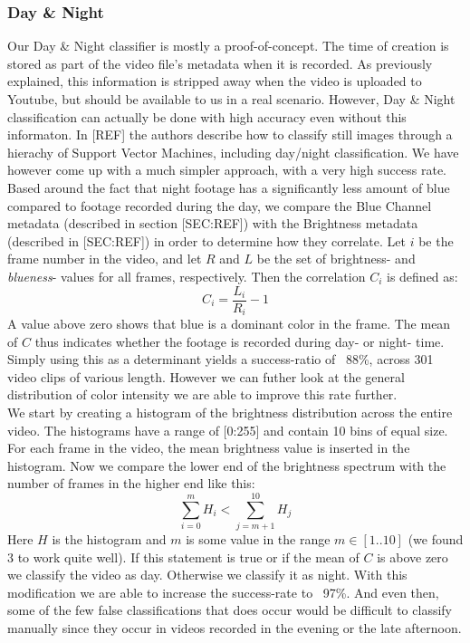 \subsubsection{Day \& Night}
%
Our Day \& Night classifier is mostly a proof-of-concept. The time of creation is stored as part of the video file's metadata when it is recorded. As previously explained, this information is stripped away when the video is uploaded to Youtube, but should be available to us in a real scenario. However, Day \& Night classification can actually be done with high accuracy even without this informaton. In [REF] the authors describe how to classify still images through a hierachy of Support Vector Machines, including day/night classification. We have however come up with a much simpler approach, with a very high success rate.\\
Based around the fact that night footage has a significantly less amount of blue compared to footage recorded during the day, we compare the Blue Channel metadata (described in section [SEC:REF]) with the Brightness metadata (described in [SEC:REF]) in order to determine how they correlate. Let $i$ be the frame number in the video, and let $R$ and $L$ be the set of brightness- and \textit{blueness}- values for all frames, respectively. Then the correlation $C_{i}$ is defined as:\\
%
\begin{equation}
C_{i} = \frac{L_{i}}{R_{i}} - 1
\end{equation}
%
A value above zero shows that blue is a dominant color in the frame. The mean of $C$ thus indicates whether the footage is recorded during day- or night- time. Simply using this as a determinant yields a success-ratio of ~88\%, across 301 video clips of various length.
%
%
However we can futher look at the general distribution of color intensity we are able to improve this rate further.\\
We start by creating a histogram of the brightness distribution across the entire video. The histograms have a range of [0:255] and contain 10 bins of equal size. For each frame in the video, the mean brightness value is inserted in the histogram. Now we compare the lower
%
%
end of the brightness spectrum
%
%
with the number of frames in the higher end like this:
%
\begin{equation}
\sum_{i=0}^{m}H_{i} < \sum_{j=m+1}^{10}H_{j}
\end{equation}
%
%
%
Here $H$ is the histogram and $m$ is some value in the range $m\in [1..10]$ (we found $3$ to work quite well). If this statement is true or if the mean of $C$ is above zero we classify the video as day. Otherwise we classify it as night. With this modification we are able to increase the success-rate to ~97\%. And even then, some of the few false classifications that does occur would be difficult to classify manually since they occur in videos recorded in the evening or the late afternoon.
